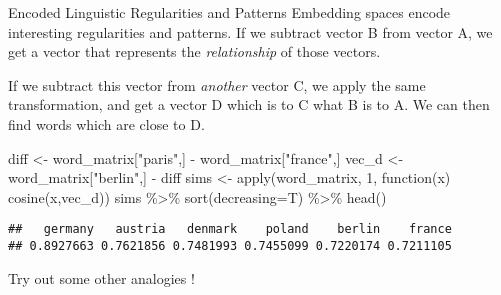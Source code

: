 \documentclass[
  10pt,
  ignorenonframetext,
  aspectratio=169]{beamer}
\newenvironment{Shaded}{\begin{snugshade}}{\end{snugshade}}
\newcommand{\AttributeTok}[1]{\textcolor[rgb]{0.80,0.80,0.80}{#1}}
\newcommand{\ControlFlowTok}[1]{\textcolor[rgb]{0.94,0.87,0.69}{#1}}
\newcommand{\DecValTok}[1]{\textcolor[rgb]{0.86,0.86,0.80}{#1}}
\newcommand{\FunctionTok}[1]{\textcolor[rgb]{0.94,0.94,0.56}{#1}}
\newcommand{\NormalTok}[1]{\textcolor[rgb]{0.80,0.80,0.80}{#1}}
\newcommand{\OtherTok}[1]{\textcolor[rgb]{0.94,0.94,0.56}{#1}}
\newcommand{\SpecialCharTok}[1]{\textcolor[rgb]{0.86,0.64,0.64}{#1}}
\newcommand{\StringTok}[1]{\textcolor[rgb]{0.80,0.58,0.58}{#1}}
\begin{document}
\begin{frame}[fragile]{Encoded Linguistic Regularities and Patterns}
\protect\hypertarget{encoded-linguistic-regularities-and-patterns}{}
Embedding spaces encode interesting regularities and patterns. If we
subtract vector B from vector A, we get a vector that represents the
\emph{relationship} of those vectors.

If we subtract this vector from \emph{another} vector C, we apply the
same transformation, and get a vector D which is to C what B is to A. We
can then find words which are close to D.

\medskip

\scriptsize

\begin{Shaded}
\begin{Highlighting}[]
\NormalTok{diff }\OtherTok{\textless{}{-}}\NormalTok{ word\_matrix[}\StringTok{"paris"}\NormalTok{,]  }\SpecialCharTok{{-}}\NormalTok{ word\_matrix[}\StringTok{"france"}\NormalTok{,] }
\NormalTok{vec\_d }\OtherTok{\textless{}{-}}\NormalTok{ word\_matrix[}\StringTok{"berlin"}\NormalTok{,] }\SpecialCharTok{{-}}\NormalTok{ diff}
\NormalTok{sims }\OtherTok{\textless{}{-}} \FunctionTok{apply}\NormalTok{(word\_matrix, }\DecValTok{1}\NormalTok{, }\ControlFlowTok{function}\NormalTok{(x) }\FunctionTok{cosine}\NormalTok{(x,vec\_d))}
\NormalTok{sims }\SpecialCharTok{\%\textgreater{}\%} \FunctionTok{sort}\NormalTok{(}\AttributeTok{decreasing=}\NormalTok{T) }\SpecialCharTok{\%\textgreater{}\%} \FunctionTok{head}\NormalTok{()}
\end{Highlighting}
\end{Shaded}

\begin{verbatim}
##   germany   austria   denmark    poland    berlin    france 
## 0.8927663 0.7621856 0.7481993 0.7455099 0.7220174 0.7211105
\end{verbatim}

\medskip
\normalsize

Try out some other analogies !
\end{frame}
\end{document}
